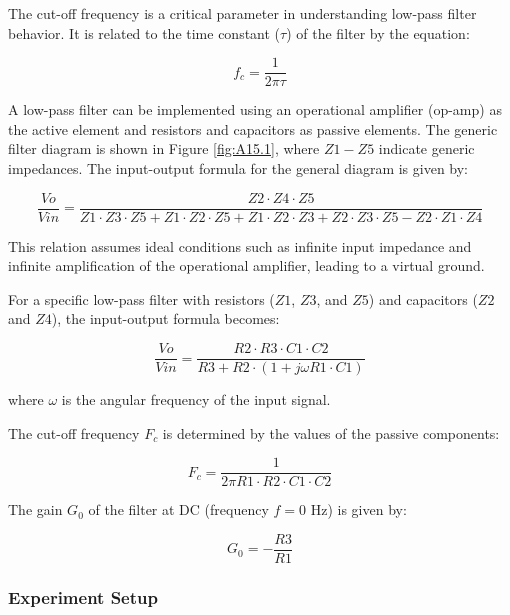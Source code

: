 The cut-off frequency is a critical parameter in understanding low-pass filter behavior. It is related to the time constant (\(\tau\)) of the filter by the equation:

\[
f_c = \frac{1}{2\pi\tau}
\]

A low-pass filter can be implemented using an operational amplifier (op-amp) as the active element and resistors and capacitors as passive elements. The generic filter diagram is shown in Figure \ref{fig:A15.1}, where $Z1-Z5$ indicate generic impedances. The input-output formula for the general diagram is given by:

\begin{equation}
    \frac{Vo}{Vin} = \frac{Z2 \cdot Z4 \cdot Z5}{Z1 \cdot Z3 \cdot Z5 + Z1 \cdot Z2 \cdot Z5 + Z1 \cdot Z2 \cdot Z3 + Z2 \cdot Z3 \cdot Z5 - Z2 \cdot Z1 \cdot Z4}
\end{equation}

This relation assumes ideal conditions such as infinite input impedance and infinite amplification of the operational amplifier, leading to a virtual ground.


For a specific low-pass filter with resistors ($Z1$, $Z3$, and $Z5$) and capacitors ($Z2$ and $Z4$), the input-output formula becomes:

\begin{equation}
    \frac{Vo}{Vin} = \frac{R2 \cdot R3 \cdot C1 \cdot C2}{R3 + R2 \cdot (1 + j \omega R1 \cdot C1)}
\end{equation}

where $\omega$ is the angular frequency of the input signal.

The cut-off frequency $F_c$ is determined by the values of the passive components:

\begin{equation}
    F_c = \frac{1}{2 \pi R1 \cdot R2 \cdot C1 \cdot C2}
\end{equation}

The gain $G_0$ of the filter at DC (frequency $f = 0$ Hz) is given by:

\begin{equation}
    G_0 = -\frac{R3}{R1}
\end{equation}
\subsubsection{Experiment Setup}

